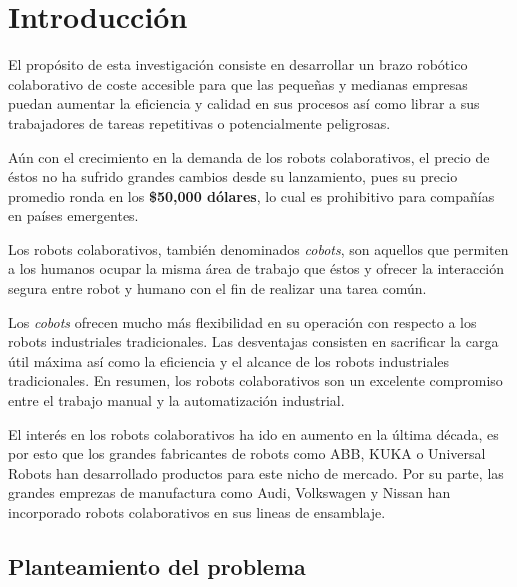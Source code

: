\chapter{Introducción}

El propósito de esta investigación consiste en desarrollar un brazo robótico colaborativo de coste accesible para que las pequeñas y medianas empresas puedan aumentar la eficiencia y calidad en sus procesos así como librar a sus trabajadores de tareas repetitivas o potencialmente peligrosas. %

Aún con el crecimiento en la demanda de los robots colaborativos, el precio de éstos no ha sufrido grandes cambios desde su lanzamiento, pues su precio promedio ronda en los \textbf{\$50,000 dólares}, lo cual es prohibitivo para compañías en países emergentes. %

Los robots colaborativos, también denominados \textit{cobots}, son aquellos que permiten a los humanos ocupar la misma área de trabajo que éstos y ofrecer la interacción segura entre robot y humano con el fin de realizar una tarea común.  %

Los \textit{cobots} ofrecen mucho más flexibilidad en su operación con respecto a los robots industriales tradicionales. Las desventajas consisten en sacrificar la carga útil máxima así como la  eficiencia y el alcance de los robots industriales tradicionales. En resumen, los robots colaborativos son un excelente compromiso entre el trabajo manual y la automatización industrial. \cite{Zaatari2019} %

El interés en los robots colaborativos ha ido en aumento en la última década, es por esto que los grandes fabricantes de robots como ABB, KUKA o Universal Robots han desarrollado productos para este nicho de mercado. Por su parte, las grandes emprezas de manufactura como Audi, Volkswagen y Nissan han incorporado robots colaborativos en sus lineas de ensamblaje. \cite{Zaatari2019} %

\begin{comment}
Párrafo uno: Introducción sobre los robots colaborativos
Párrafo dos: Ventajas con respecto a robots tradicionales
Párrafo tres: Pertinencia de la investigación en la actualidad
Párrafo cuatro: Propósito de la investigación.
Párrafo cinco: Propósito de la investigación e interés social.
\end{comment}

\section{Planteamiento del problema}

